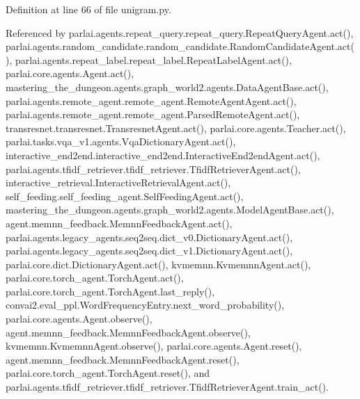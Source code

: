 Definition at line 66 of file unigram.\+py.



Referenced by parlai.\+agents.\+repeat\+\_\+query.\+repeat\+\_\+query.\+Repeat\+Query\+Agent.\+act(), parlai.\+agents.\+random\+\_\+candidate.\+random\+\_\+candidate.\+Random\+Candidate\+Agent.\+act(), parlai.\+agents.\+repeat\+\_\+label.\+repeat\+\_\+label.\+Repeat\+Label\+Agent.\+act(), parlai.\+core.\+agents.\+Agent.\+act(), mastering\+\_\+the\+\_\+dungeon.\+agents.\+graph\+\_\+world2.\+agents.\+Data\+Agent\+Base.\+act(), parlai.\+agents.\+remote\+\_\+agent.\+remote\+\_\+agent.\+Remote\+Agent\+Agent.\+act(), parlai.\+agents.\+remote\+\_\+agent.\+remote\+\_\+agent.\+Parsed\+Remote\+Agent.\+act(), transresnet.\+transresnet.\+Transresnet\+Agent.\+act(), parlai.\+core.\+agents.\+Teacher.\+act(), parlai.\+tasks.\+vqa\+\_\+v1.\+agents.\+Vqa\+Dictionary\+Agent.\+act(), interactive\+\_\+end2end.\+interactive\+\_\+end2end.\+Interactive\+End2end\+Agent.\+act(), parlai.\+agents.\+tfidf\+\_\+retriever.\+tfidf\+\_\+retriever.\+Tfidf\+Retriever\+Agent.\+act(), interactive\+\_\+retrieval.\+Interactive\+Retrieval\+Agent.\+act(), self\+\_\+feeding.\+self\+\_\+feeding\+\_\+agent.\+Self\+Feeding\+Agent.\+act(), mastering\+\_\+the\+\_\+dungeon.\+agents.\+graph\+\_\+world2.\+agents.\+Model\+Agent\+Base.\+act(), agent.\+memnn\+\_\+feedback.\+Memnn\+Feedback\+Agent.\+act(), parlai.\+agents.\+legacy\+\_\+agents.\+seq2seq.\+dict\+\_\+v0.\+Dictionary\+Agent.\+act(), parlai.\+agents.\+legacy\+\_\+agents.\+seq2seq.\+dict\+\_\+v1.\+Dictionary\+Agent.\+act(), parlai.\+core.\+dict.\+Dictionary\+Agent.\+act(), kvmemnn.\+Kvmemnn\+Agent.\+act(), parlai.\+core.\+torch\+\_\+agent.\+Torch\+Agent.\+act(), parlai.\+core.\+torch\+\_\+agent.\+Torch\+Agent.\+last\+\_\+reply(), convai2.\+eval\+\_\+ppl.\+Word\+Frequency\+Entry.\+next\+\_\+word\+\_\+probability(), parlai.\+core.\+agents.\+Agent.\+observe(), agent.\+memnn\+\_\+feedback.\+Memnn\+Feedback\+Agent.\+observe(), kvmemnn.\+Kvmemnn\+Agent.\+observe(), parlai.\+core.\+agents.\+Agent.\+reset(), agent.\+memnn\+\_\+feedback.\+Memnn\+Feedback\+Agent.\+reset(), parlai.\+core.\+torch\+\_\+agent.\+Torch\+Agent.\+reset(), and parlai.\+agents.\+tfidf\+\_\+retriever.\+tfidf\+\_\+retriever.\+Tfidf\+Retriever\+Agent.\+train\+\_\+act().

\mbox{\label{classparlai_1_1agents_1_1unigram_1_1unigram_1_1UnigramAgent_abfbd6ca4f56545ac9c4514f38e65d1a2}} 
